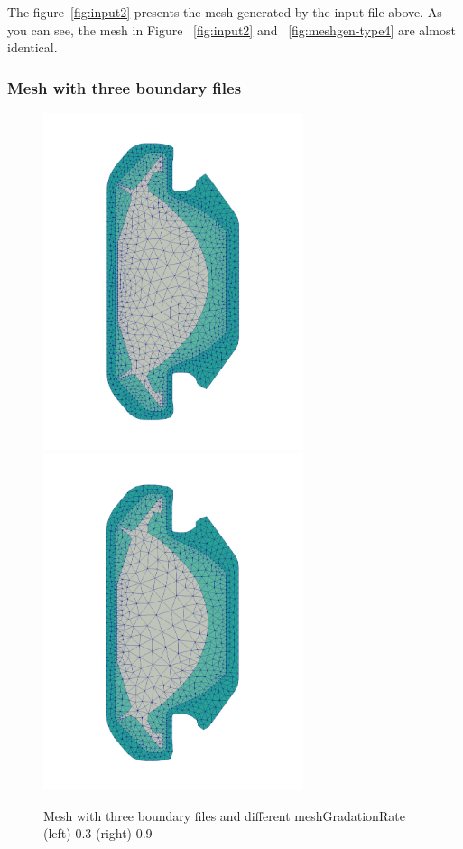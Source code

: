 The figure~\ref{fig:input2} presents the mesh generated by the input file above. As you can see, the mesh in Figure ~\ref{fig:input2} and ~\ref{fig:meshgen-type4} are almost identical.


\subsubsection{Mesh with three boundary files}

\begin{figure}
\centering
\includegraphics[width=3in]{./figures/meshgen-input3-novacuum.pdf}
\includegraphics[width=3in]{./figures/meshgen-input3-novacuum2.pdf}
\caption
{Mesh with three boundary files and different meshGradationRate (left) 0.3 (right) 0.9}
\label{fig:input3-novacuum}
\end{figure}

